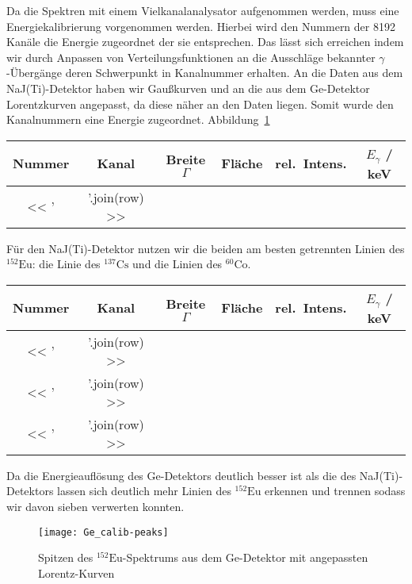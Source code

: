 \documentclass[11pt, ngerman, fleqn, DIV=15, headinclude, BCOR=2cm]{scrreprt}
\newcommand{\plotwidth}{0.8\linewidth}
\begin{document}
Da die Spektren mit einem Vielkanalanalysator aufgenommen werden, muss eine
Energiekalibrierung vorgenommen werden. Hierbei wird den Nummern der 8192
Kanäle die Energie zugeordnet der sie entsprechen.
Das lässt sich erreichen indem wir durch Anpassen von Verteilungsfunktionen an die
Ausschläge bekannter $\gamma$-Übergänge deren Schwerpunkt in Kanalnummer
erhalten. An die Daten aus dem NaJ(Ti)-Detektor haben wir Gaußkurven und an die
aus dem Ge-Detektor Lorentzkurven angepasst, da diese näher an den Daten liegen.
Somit wurde den Kanalnummern eine Energie zugeordnet. Abbildung~\ref{fig:Ge-peaks}

\begin{tabular}{SSSSSS}
    {Nummer} & {Kanal} & {Breite $\Gamma$} & {Fläche} & {rel.\ Intens.} &
    {$E_\gamma$ / \si{\kilo\electronvolt}} \\
    \midrule
    << ' & '.join(row) >> \\
\end{tabular}

Für den NaJ(Ti)-Detektor nutzen wir die beiden am besten getrennten Linien des
$^{152}\text{Eu}$: die Linie des $^{137}\text{Cs}$ und die Linien des
$^{60}\text{Co}$.

\begin{tabular}{SSSSSS}
    {Nummer} & {Kanal} & {Breite $\Gamma$} & {Fläche} & {rel.\ Intens.} &
    {$E_\gamma$ / \si{\kilo\electronvolt}} \\
    \midrule
    << ' & '.join(row) >> \\
    \midrule
    << ' & '.join(row) >> \\
    \midrule
    << ' & '.join(row) >> \\
\end{tabular}

Da die Energieauflösung des Ge-Detektors deutlich besser ist als die des 
NaJ(Ti)-Detektors lassen sich deutlich mehr Linien des $^{152}\text{Eu}$
erkennen und trennen sodass wir davon sieben verwerten konnten.

\begin{figure}
    \centering
    \texttt{[image: Ge\_calib-peaks]}
    \caption{%
	    Spitzen des $^{152}\text{Eu}$-Spektrums aus dem Ge-Detektor  mit
	    angepassten Lorentz-Kurven
    }
    \label{fig:Ge-peaks}

\end{figure}
\end{document}
